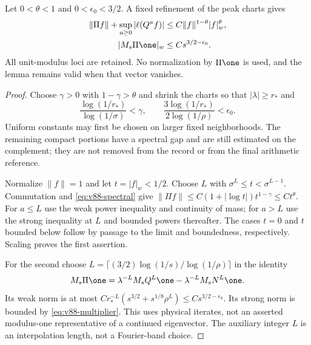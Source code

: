\begin{lemma}\label{lem:v88-interpolation}
Let $0<\theta<1$ and $0<\epsilon_0<3/2$. A fixed refinement of the
peak charts gives
\begin{align}
 \|\Pi f\|+\sup_{a\ge0}|\ell(Q^a f)|
       &\le C\|f\|^{1-\theta}|f|_w^\theta,
                                        \label{eq:v88-interpolation}\\
 |M_s\Pi\one|_w&\le Cs^{3/2-\epsilon_0}.
                                        \label{eq:v88-projected}
\end{align}
All unit-modulus loci are retained. No normalization by $\Pi\one$ is
used, and the lemma remains valid when that vector vanishes.
\end{lemma}
\begin{proof}
Choose $\gamma>0$ with $1-\gamma>\theta$ and shrink the charts so that
$|\lambda|\ge r_*$ and
\[
 \frac{\log(1/r_*)}{\log(1/\sigma)}<\gamma,\qquad
 \frac{3\log(1/r_*)}{2\log(1/\rho)}<\epsilon_0.
\]
Uniform constants may first be chosen on larger fixed neighborhoods.
The remaining compact portions have a spectral gap and are still
estimated on the complement; they are not removed from the record or
from the final arithmetic reference.

Normalize $\|f\|=1$ and let $t=|f|_w<1/2$. Choose $L$ with
$\sigma^L\le t<\sigma^{L-1}$. Commutation and
\eqref{eq:v88-spectral} give
$\|\Pi f\|\le C(1+|\log t|)t^{1-\gamma}\le Ct^\theta$.
For $a\le L$ use the weak power inequality and continuity of mass;
for $a>L$ use the strong inequality at $L$ and bounded powers
thereafter. The cases $t=0$ and $t$ bounded below follow by passage to the limit
and boundedness, respectively. Scaling proves the first assertion.

For the second choose
$L=\lceil(3/2)\log(1/s)/\log(1/\rho)\rceil$ in the identity
\[
 M_s\Pi\one=\lambda^{-L}M_sQ^L\one-
                         \lambda^{-L}M_sN^L\one.
\]
Its weak norm is at most
$Cr_*^{-L}(s^{3/2}+s^{1/8}\rho^L)\le Cs^{3/2-\epsilon_0}$.
Its strong norm is bounded by \eqref{eq:v88-multiplier}. This uses
physical iterates, not an asserted modulus-one representative of a
continued eigenvector. The auxiliary integer $L$ is an interpolation
length, not a Fourier-band choice.
\end{proof}

